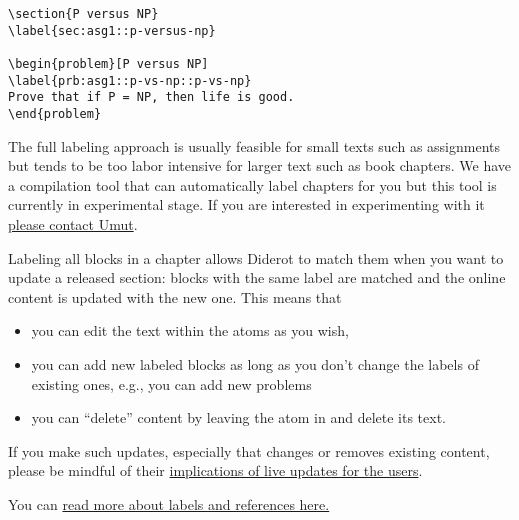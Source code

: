 \begin{example}
\begin{lstlisting}
\section{P versus NP}
\label{sec:asg1::p-versus-np}

\begin{problem}[P versus NP]
\label{prb:asg1::p-vs-np::p-vs-np}
Prove that if P = NP, then life is good.
\end{problem}

\end{lstlisting}
\end{example}


\begin{important}
The full labeling approach is usually feasible for small texts such as assignments but tends to be too labor intensive for larger text such as book chapters.
%
We have a compilation tool that can automatically label chapters for you but this tool is currently in experimental stage.
%
If you are interested in experimenting with it \href{mailto:umut@cs.cmu.edu}{please contact Umut}.
\end{important}

Labeling all blocks in a chapter allows Diderot to match them when you want to update a released section: blocks with the same label are matched and the online content is updated with the new one.
%
This means that 
\begin{itemize}

\item you can edit the text within the atoms as you wish,
%

\item you can add new labeled blocks as long as you don't change the labels of existing ones, e.g., you can add new problems

\item you can ``delete'' content by leaving the atom in and delete its text.
\end{itemize}
%
If you make such updates, especially that changes or removes existing content, 
please be mindful of their 
%
\href{grm:publish::released::user-implications}{implications of live updates for the users}.

\begin{note}
You can \href{sec:dc::labels-refs}{read more about labels and references here.}
\end{note}

